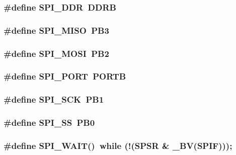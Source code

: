 \subsubsection{\setlength{\rightskip}{0pt plus 5cm}\#define SPI\_\-DDR~DDRB}\label{spi_8c_8b07abe3c166558485851f24f2141dc9}


\subsubsection{\setlength{\rightskip}{0pt plus 5cm}\#define SPI\_\-MISO~PB3}\label{spi_8c_b142cc77dfa97010c9d2b616d0992b64}


\subsubsection{\setlength{\rightskip}{0pt plus 5cm}\#define SPI\_\-MOSI~PB2}\label{spi_8c_7dbebab5f7dd57885adccf6711b13592}


\subsubsection{\setlength{\rightskip}{0pt plus 5cm}\#define SPI\_\-PORT~PORTB}\label{spi_8c_8112c985f7444e82198d7571ce0a9160}


\subsubsection{\setlength{\rightskip}{0pt plus 5cm}\#define SPI\_\-SCK~PB1}\label{spi_8c_750ca7c9b92cfc9e57272ff3a49db48b}


\subsubsection{\setlength{\rightskip}{0pt plus 5cm}\#define SPI\_\-SS~PB0}\label{spi_8c_81f0aae3c3a2adba06ac3b802b38915a}


\subsubsection{\setlength{\rightskip}{0pt plus 5cm}\#define SPI\_\-WAIT()~while (!(SPSR \& \_\-BV(SPIF)));}\label{spi_8c_017204f162223026f7b9fcaa52398cef}




